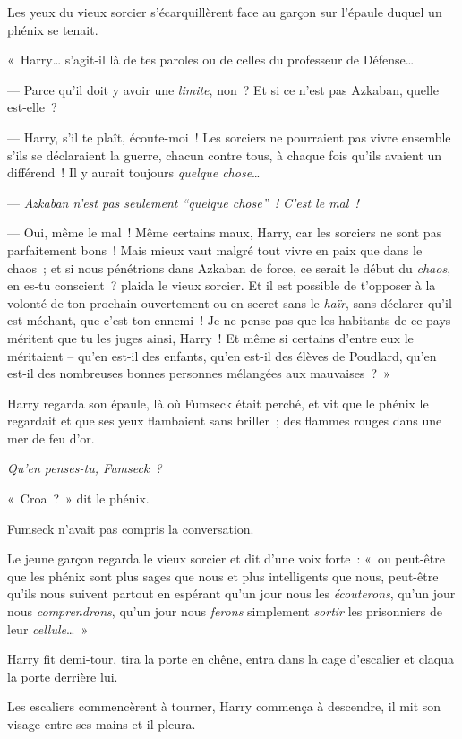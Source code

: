 Les yeux du vieux sorcier s'écarquillèrent face au garçon sur l'épaule duquel un phénix se tenait.

«~Harry… s'agit-il là de tes paroles ou de celles du professeur de Défense…

--- Parce qu'il doit y avoir une \emph{limite}, non~? Et si ce n'est pas Azkaban, quelle est-elle~?

--- Harry, s'il te plaît, écoute-moi~! Les sorciers ne pourraient pas vivre ensemble s'ils se déclaraient la guerre, chacun contre tous, à chaque fois qu'ils avaient un différend~! Il y aurait toujours \emph{quelque chose}…

--- \emph{Azkaban n'est pas seulement “quelque chose”~! C'est le mal~!}

--- Oui, même le mal~! Même certains maux, Harry, car les sorciers ne sont pas parfaitement bons~! Mais mieux vaut malgré tout vivre en paix que dans le chaos~; et si nous pénétrions dans Azkaban de force, ce serait le début du \emph{chaos}, en es-tu conscient~? plaida le vieux sorcier. Et il est possible de t'opposer à la volonté de ton prochain ouvertement ou en secret sans le \emph{haïr}, sans déclarer qu'il est méchant, que c'est ton ennemi~! Je ne pense pas que les habitants de ce pays méritent que tu les juges ainsi, Harry~! Et même si certains d'entre eux le méritaient -- qu'en est-il des enfants, qu'en est-il des élèves de Poudlard, qu'en est-il des nombreuses bonnes personnes mélangées aux mauvaises~?~»

Harry regarda son épaule, là où Fumseck était perché, et vit que le phénix le regardait et que ses yeux flambaient sans briller~; des flammes rouges dans une mer de feu d'or.

\emph{Qu'en penses-tu, Fumseck~?}

«~Croa~?~» dit le phénix.

Fumseck n'avait pas compris la conversation.

Le jeune garçon regarda le vieux sorcier et dit d'une voix forte~: «~ou peut-être que les phénix sont plus sages que nous et plus intelligents que nous, peut-être qu'ils nous suivent partout en espérant qu'un jour nous les \emph{écouterons}, qu'un jour nous \emph{comprendrons}, qu'un jour nous \emph{ferons} simplement \emph{sortir} les prisonniers de leur \emph{cellule}…~»

Harry fit demi-tour, tira la porte en chêne, entra dans la cage d'escalier et claqua la porte derrière lui.

Les escaliers commencèrent à tourner, Harry commença à descendre, il mit son visage entre ses mains et il pleura.

